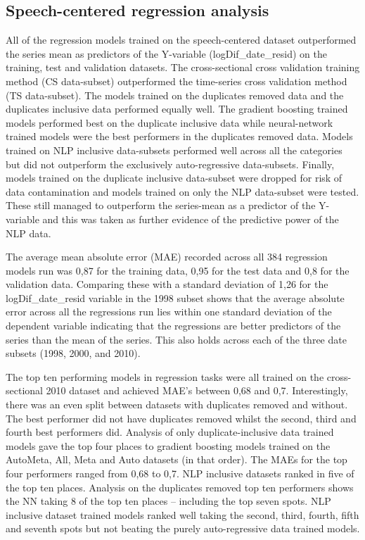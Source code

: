 \documentclass[11pt,preprint, authoryear]{elsarticle}
\numberwithin{equation}{section}
\numberwithin{figure}{section}
\numberwithin{table}{section}
\begin{document}
\hypertarget{speech-centered-regression-analysis}{%
\subsection{Speech-centered regression
analysis}\label{speech-centered-regression-analysis}}

All of the regression models trained on the speech-centered dataset
outperformed the series mean as predictors of the Y-variable
(logDif\_date\_resid) on the training, test and validation datasets. The
cross-sectional cross validation training method (CS data-subset)
outperformed the time-series cross validation method (TS data-subset).
The models trained on the duplicates removed data and the duplicates
inclusive data performed equally well. The gradient boosting trained
models performed best on the duplicate inclusive data while
neural-network trained models were the best performers in the duplicates
removed data. Models trained on NLP inclusive data-subsets performed
well across all the categories but did not outperform the exclusively
auto-regressive data-subsets. Finally, models trained on the duplicate
inclusive data-subset were dropped for risk of data contamination and
models trained on only the NLP data-subset were tested. These still
managed to outperform the series-mean as a predictor of the Y-variable
and this was taken as further evidence of the predictive power of the
NLP data.

The average mean absolute error (MAE) recorded across all 384 regression
models run was 0,87 for the training data, 0,95 for the test data and
0,8 for the validation data. Comparing these with a standard deviation
of 1,26 for the logDif\_date\_resid variable in the 1998 subset shows
that the average absolute error across all the regressions run lies
within one standard deviation of the dependent variable indicating that
the regressions are better predictors of the series than the mean of the
series. This also holds across each of the three date subsets (1998,
2000, and 2010).

The top ten performing models in regression tasks were all trained on
the cross-sectional 2010 dataset and achieved MAE's between 0,68 and
0,7. Interestingly, there was an even split between datasets with
duplicates removed and without. The best performer did not have
duplicates removed whilst the second, third and fourth best performers
did. Analysis of only duplicate-inclusive data trained models gave the
top four places to gradient boosting models trained on the AutoMeta,
All, Meta and Auto datasets (in that order). The MAEs for the top four
performers ranged from 0,68 to 0,7. NLP inclusive datasets ranked in
five of the top ten places. Analysis on the duplicates removed top ten
performers shows the NN taking 8 of the top ten places -- including the
top seven spots. NLP inclusive dataset trained models ranked well taking
the second, third, fourth, fifth and seventh spots but not beating the
purely auto-regressive data trained models.
\end{document}
